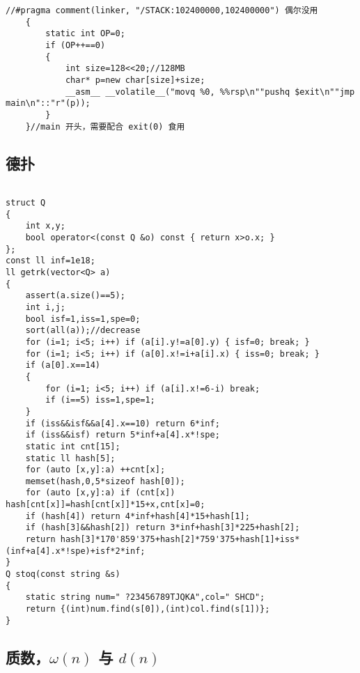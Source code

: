 \documentclass[12pt]{ctexart}
\begin{document}
\begin{lstlisting}
//#pragma comment(linker, "/STACK:102400000,102400000") 偶尔没用
	{
		static int OP=0;
		if (OP++==0)
		{
			int size=128<<20;//128MB
			char* p=new char[size]+size;
			__asm__ __volatile__("movq %0, %%rsp\n""pushq $exit\n""jmp main\n"::"r"(p));
		}
	}//main 开头，需要配合 exit(0) 食用
\end{lstlisting}

\subsection{德扑}

\begin{lstlisting}

struct Q
{
	int x,y;
	bool operator<(const Q &o) const { return x>o.x; }
};
const ll inf=1e18;
ll getrk(vector<Q> a)
{
	assert(a.size()==5);
	int i,j;
	bool isf=1,iss=1,spe=0;
	sort(all(a));//decrease
	for (i=1; i<5; i++) if (a[i].y!=a[0].y) { isf=0; break; }
	for (i=1; i<5; i++) if (a[0].x!=i+a[i].x) { iss=0; break; }
	if (a[0].x==14)
	{
		for (i=1; i<5; i++) if (a[i].x!=6-i) break;
		if (i==5) iss=1,spe=1;
	}
	if (iss&&isf&&a[4].x==10) return 6*inf;
	if (iss&&isf) return 5*inf+a[4].x*!spe;
	static int cnt[15];
	static ll hash[5];
	for (auto [x,y]:a) ++cnt[x];
	memset(hash,0,5*sizeof hash[0]);
	for (auto [x,y]:a) if (cnt[x]) hash[cnt[x]]=hash[cnt[x]]*15+x,cnt[x]=0;
	if (hash[4]) return 4*inf+hash[4]*15+hash[1];
	if (hash[3]&&hash[2]) return 3*inf+hash[3]*225+hash[2];
	return hash[3]*170'859'375+hash[2]*759'375+hash[1]+iss*(inf+a[4].x*!spe)+isf*2*inf;
}
Q stoq(const string &s)
{
	static string num=" ?23456789TJQKA",col=" SHCD";
	return {(int)num.find(s[0]),(int)col.find(s[1])};
}
\end{lstlisting}


\subsection{质数，$\omega(n)$ 与 $d(n)$}
\end{document}
